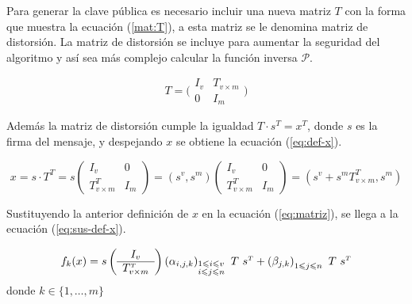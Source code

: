 Para generar la clave pública es necesario incluir una nueva matriz $T$ con la forma que muestra la ecuación (\ref{mat:T}), a esta matriz se le denomina matriz de distorsión. La matriz de distorsión se incluye para aumentar la seguridad del algoritmo y así sea más complejo calcular la función inversa $\mathcal{P}$.

\begin{equation}
	T =
	\Bigg(
	\begin{array}{c|c}
	I_v & T_{v\times m} \\
	\hline
	0 & I_m
	\end{array}
	\Bigg)
	\label{mat:T}
\end{equation}

Además la matriz de distorsión cumple la igualdad $T\cdot s^{\scriptscriptstyle T} = x ^{\scriptscriptstyle T}$, donde $s$ es la firma del mensaje, y despejando $x$ se obtiene la ecuación (\ref{eq:def-x}).

\begin{equation}
	x =  s \cdot T^{\scriptscriptstyle T} = s  \left(
	\begin{array}{c|c}
	I_v & 0 \\
	\hline
	T^{\scriptscriptstyle T}_{v \times m} & I_m
	\end{array}
	\right)
	= \left(s^v, s^m\right) \left(
	\begin{array}{c|c}
	I_v & 0 \\
	\hline
	T^{\scriptscriptstyle T}_{v \times m} & I_m
	\end{array}
	\right)
	= \left(s^v + s^m T^{\scriptscriptstyle T}_{v\times m}, s^m \right)
	\label{eq:def-x}
\end{equation}

Sustituyendo la anterior definición de $x$ en la ecuación (\ref{eq:matriz}), se llega a la ecuación (\ref{eq:sus-def-x}).

\begin{equation}
	f_k(x) = s  
	\left(\begin{array}{c}
		I_v \\
		\hline
		T^{\scriptscriptstyle T}_{v \times m}
	\end{array}\right)
	\left(\alpha_{i,j,k}\right)_{\begin{subarray}{l}{1\leqslant i \leqslant v }\\ {i \leqslant j \leqslant n}\end{subarray}}\ T \ s^{\scriptscriptstyle T} + 
	\left(\beta_{j,k}\right)_{1\leqslant j\leqslant n}\ T\ s^{\scriptscriptstyle T}
	\label{eq:sus-def-x}
\end{equation}
donde $k \in \{1,\dots,m\}$


